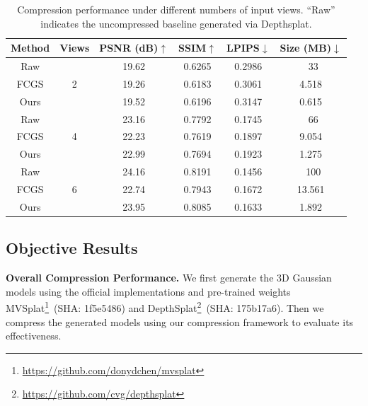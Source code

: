 \documentclass[lettersize,journal]{IEEEtran}
\begin{document}
\begin{table}[t]
  \centering
  \caption{Compression performance under different numbers of input views. ``Raw'' indicates the uncompressed baseline generated via Depthsplat.}
  \vspace{0.5em}
  \footnotesize
  \begin{tabular}{cccccc
                }
    \toprule
    Method & Views & PSNR (dB)$\uparrow$ & SSIM$\uparrow$ & LPIPS$\downarrow$ & Size (MB)$\downarrow$ \\
    \midrule
    Raw   & \multirow{3}[2]{*}{2} & 19.62  & 0.6265  & 0.2986  & ~33 \\
    FCGS  &       & 19.26  & 0.6183  & 0.3061  & 4.518  \\
    Ours  &       & 19.52  & 0.6196  & 0.3147  & 0.615  \\
    \midrule
    Raw   & \multirow{3}[2]{*}{4} & 23.16  & 0.7792  & 0.1745  & ~66 \\
    FCGS  &       & 22.23  & 0.7619  & 0.1897  & 9.054  \\
    Ours  &       & 22.99  & 0.7694  & 0.1923  & 1.275  \\
    \midrule
    Raw   & \multirow{3}[2]{*}{6} & 24.16  & 0.8191  & 0.1456  & ~100 \\
    FCGS  &       & 22.74  & 0.7943  & 0.1672  & 13.561  \\
    Ours  &       & 23.95  & 0.8085  & 0.1633  & 1.892  \\
    \bottomrule
  \end{tabular}
  \label{tab:compression_views}
\end{table}

\subsection{Objective Results}

\textbf{Overall Compression Performance.}
We first generate the 3D Gaussian models using 
the official implementations and pre-trained weights MVSplat\footnote{\url{https://github.com/donydchen/mvsplat}}~(SHA: 1f5e5486) and DepthSplat\footnote{\url{https://github.com/cvg/depthsplat}}~(SHA: 175b17a6). Then we compress the generated models using our compression framework to evaluate its effectiveness. 
\end{document}
